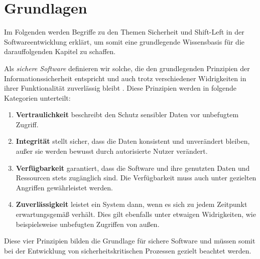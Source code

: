 \section{Grundlagen}

Im Folgenden werden Begriffe zu den Themen Sicherheit und Shift-Left in der Softwareentwicklung erklärt, um somit eine grundlegende Wissensbasis für die darauffolgenden Kapitel zu schaffen.

Als \textit{sichere Software} definieren wir solche, die den grundlegenden Prinzipien der Informationssicherheit \cite{blakley_information_2001} entspricht und auch trotz verschiedener Widrigkeiten in ihrer Funktionalität zuverlässig bleibt \cite{oueslati_literature_2015}. Diese Prinzipien werden in folgende Kategorien unterteilt:
\begin{enumerate}
\item \textbf{Vertraulichkeit} beschreibt den Schutz sensibler Daten vor unbefugtem Zugriff.
\item \textbf{Integrität} stellt sicher, dass die Daten konsistent und unverändert bleiben, außer sie werden bewusst durch autorisierte Nutzer verändert.
\item \textbf{Verfügbarkeit} garantiert, dass die Software und ihre genutzten Daten und Ressourcen stets zugänglich sind. Die Verfügbarkeit muss auch unter gezielten Angriffen gewährleistet werden.
\item \textbf{Zuverlässigkeit} leistet ein System dann, wenn es sich zu jedem Zeitpunkt erwartungsgemäß verhält. Dies gilt ebenfalls unter etwaigen Widrigkeiten, wie beispielsweise unbefugten Zugriffen von außen.
\end{enumerate}
Diese vier Prinzipien bilden die Grundlage für sichere Software und müssen somit bei der Entwicklung von sicherheitskritischen Prozessen gezielt beachtet werden.

